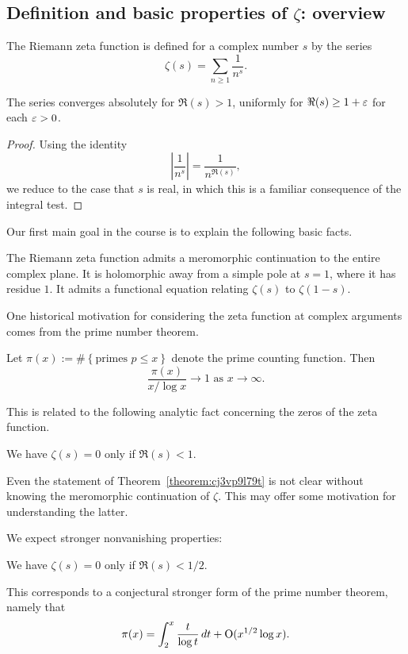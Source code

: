 \documentclass[reqno]{amsart}  \numberwithin{theorem}{section} \numberwithin{equation}{section}
\begin{document}
\subsection{Definition and basic properties of $\zeta$: overview}
The Riemann zeta function is defined for a complex number $s$ by the series
\begin{equation*}
  \zeta (s) = \sum_{n \geq 1} \frac{1}{n^s }.
\end{equation*}
\begin{lemma}
  The series converges absolutely for $\Re(s) > 1$, uniformly for $\Re(s) \geq 1 + \varepsilon$ for each $\varepsilon > 0$.
\end{lemma}
\begin{proof}
  Using the identity
  \begin{equation*}
    \left\lvert \frac{1}{n^s} \right\rvert = \frac{1}{n^{\Re(s)}},
  \end{equation*}
  we reduce to the case that $s$ is real, in which this is a familiar consequence of the integral test.
\end{proof}

Our first main goal in the course is to explain the following basic facts.
\begin{theorem}
  The Riemann zeta function admits a meromorphic continuation to the entire complex plane.  It is holomorphic away from a simple pole at $s = 1$, where it has residue $1$.  It admits a functional equation relating $\zeta (s)$ to $\zeta (1-s)$.
\end{theorem}

One historical motivation for considering the zeta function at complex arguments comes from the prime number theorem.
\begin{theorem}
  Let $\pi(x) := \# \left\{ \text{primes } p \leq x \right\}$ denote the prime counting function.  Then
  \begin{equation*}
    \frac{\pi(x)}{x / \log x} \rightarrow 1
    \text{ as } x \rightarrow \infty.
  \end{equation*}
\end{theorem}
This is related to the following analytic fact concerning the zeros of the zeta function.
\begin{theorem}\label{theorem:cj3vp9l79t}
  We have $\zeta(s) = 0$ only if $\Re(s) < 1$.
\end{theorem}
\begin{remark}
  Even the statement of Theorem~\ref{theorem:cj3vp9l79t} is not clear without knowing the meromorphic continuation of $\zeta$.  This may offer some motivation for understanding the latter.
\end{remark}
We expect stronger nonvanishing properties:
\begin{conjecture}
  We have $\zeta(s) = 0$ only if $\Re(s) < 1/2$.
\end{conjecture}
This corresponds to a conjectural stronger form of the prime number theorem, namely that
\begin{equation*}
  \pi(x) = \int_2^x \frac{t}{\log t} \, d t
  + \operatorname{O} (x^{1/2} \log x).
\end{equation*}
\end{document}
